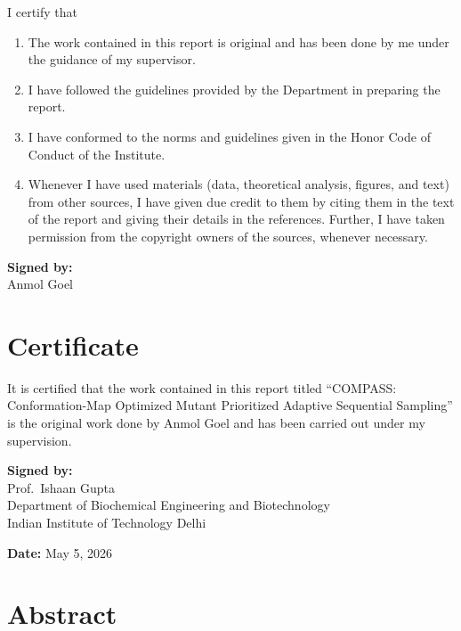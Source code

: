 \documentclass[12pt,a4paper,oneside]{report}
\begin{document}
I certify that
\begin{enumerate}[label=\alph*), itemsep=0.45ex]
\item The work contained in this report is original and has been done by me under the guidance of my supervisor.
\item I have followed the guidelines provided by the Department in preparing the report.
\item I have conformed to the norms and guidelines given in the Honor Code of Conduct of the Institute.
\item Whenever I have used materials (data, theoretical analysis, figures, and text) from other sources, I have given due credit to them by citing them in the text of the report and giving their details in the references. Further, I have taken permission from the copyright owners of the sources, whenever necessary.
\end{enumerate}

\vspace{1.5cm}
\noindent\textbf{Signed by:}\\[0.5em]
Anmol Goel

\cleardoublepage

\chapter*{Certificate}

It is certified that the work contained in this report titled ``COMPASS: Conformation-Map Optimized Mutant Prioritized Adaptive Sequential Sampling'' is the original work done by Anmol Goel and has been carried out under my supervision.

\vspace{1.5cm}
\noindent\textbf{Signed by:}\\[1.0cm]
Prof.\ Ishaan Gupta\\
Department of Biochemical Engineering and Biotechnology\\
Indian Institute of Technology Delhi

\vspace{0.8cm}
\noindent\textbf{Date:} May 5, 2026

\cleardoublepage

\chapter*{Abstract}
\end{document}
